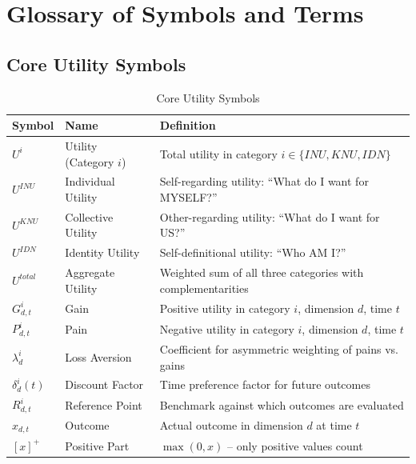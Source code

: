 
\section{Glossary of Symbols and Terms}
\label{sec:app-c-glossary}

\subsection{Core Utility Symbols}

\begin{longtable}{@{}lp{4cm}p{7cm}@{}}
\caption{Core Utility Symbols} \\
\toprule
\textbf{Symbol} & \textbf{Name} & \textbf{Definition} \\
\midrule
\endfirsthead
\midrule
\endhead
\bottomrule
\endlastfoot

$U^i$ & Utility (Category $i$) & Total utility in category $i \in \{INU, KNU, IDN\}$ \\
$U^{INU}$ & Individual Utility & Self-regarding utility: ``What do I want for MYSELF?'' \\
$U^{KNU}$ & Collective Utility & Other-regarding utility: ``What do I want for US?'' \\
$U^{IDN}$ & Identity Utility & Self-definitional utility: ``Who AM I?'' \\
$U^{total}$ & Aggregate Utility & Weighted sum of all three categories with complementarities \\
\addlinespace
$G^i_{d,t}$ & Gain & Positive utility in category $i$, dimension $d$, time $t$ \\
$P^i_{d,t}$ & Pain & Negative utility in category $i$, dimension $d$, time $t$ \\
$\lambda^i_d$ & Loss Aversion & Coefficient for asymmetric weighting of pains vs. gains \\
$\delta^i_d(t)$ & Discount Factor & Time preference factor for future outcomes \\
\addlinespace
$R^i_{d,t}$ & Reference Point & Benchmark against which outcomes are evaluated \\
$x_{d,t}$ & Outcome & Actual outcome in dimension $d$ at time $t$ \\
$[x]^+$ & Positive Part & $\max(0, x)$ -- only positive values count \\

\end{longtable}

